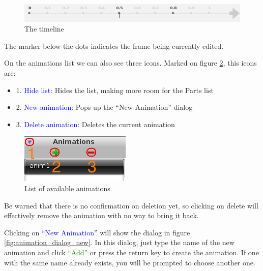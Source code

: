 \documentclass[a4paper]{profusion}
\newcommand{\GUIButton}[1]{\textcolor{green}{#1}} %
\newcommand{\GUIIcon}[1]{\textcolor{blue}{#1}}    %
\begin{document}
\begin{figure}[h!]
  \centering
  \includegraphics{images/animation_timeline.png}
  \caption{The timeline}
  \label{fig:animation_timeline}
\end{figure}

The marker below the dots indicates the frame being currently edited.

On the animations list we can also see three icons. Marked on figure
\ref{fig:animation_list}, this icons are:
\begin{itemize}
\item 1. \GUIIcon{Hide list}: Hides the list, making more room for the
  Parts list
\item 2. \GUIIcon{New animation}: Pops up the ``New Animation'' dialog
\item 3. \GUIIcon{Delete animation}: Deletes the current animation
\end{itemize}

\begin{figure}[h!]
  \centering
  \includegraphics{images/animation_list.png}
  \caption{List of available animations}
  \label{fig:animation_list}
\end{figure}

Be warned that there is no confirmation on deletion yet, so clicking
on delete will effectively remove the animation with no way to bring
it back.

Clicking on \GUIIcon{``New Animation''} will show the dialog in figure
\ref{fig:animation_dialog_new}. In this dialog, just type the name of
the new animation and click \GUIButton{``Add''} or press the return
key to create the animation. If one with the same name already exists,
you will be prompted to choose another one.
\end{document}
